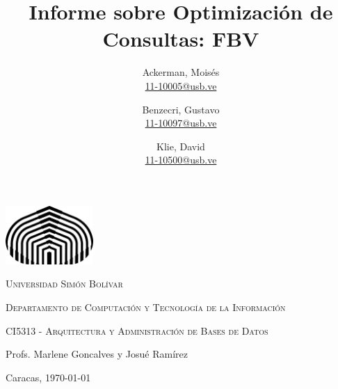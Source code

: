 \documentclass[12pt,letter]{article}
\title{\Large\bfseries{Informe sobre Optimización de Consultas: FBV}}
\author{
  Ackerman, Moisés\\
  \protect\url{11-10005@usb.ve}
  \and
  Benzecri, Gustavo\\
  \protect\url{11-10097@usb.ve}
  \and
  Klie, David\\
  \protect\url{11-10500@usb.ve}
}
\date{}
\begin{document}
\begin{titlepage}

    \centering
    \includegraphics[width=0.25\textwidth]{logoUSB.png}\par\vspace{1cm}

    {\scshape\Large Universidad Simón Bolívar \par}
    \vspace{0.2cm}
    {\scshape Departamento de Computación y Tecnología de la Información \par}
    {\scshape CI5313 - Arquitectura y Administración de Bases de Datos \par}
    \vspace{0.2cm}
    {Profs. Marlene Goncalves y Josué Ramírez \par}
    \vspace{2.5cm}

    {\let\newpage\relax\maketitle}
    \thispagestyle{empty}

    \vfill

    {\large Caracas, \today\par}

\end{titlepage}
\end{document}
